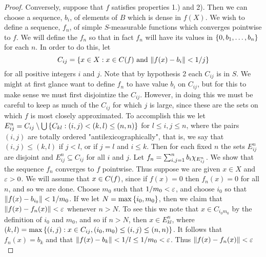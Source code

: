 \begin{proof}
Conversely, suppose that $f$ satisfies properties 1.) and 2). Then we can choose a sequence, $b_i$, of elements of $B$ which is dense in $f(X)$. We wish to define a sequence, $f_n$, of simple $S$-measurable functions which converges pointwise to $f$. We will define the $f_n$ so that in fact $f_n$ will have its values in $\left\{0, b_1, \dots, b_n\right\}$ for each $n$. In order to do this, let $$C_{ij}=\left\{x \in X: x\in C(f)\text{ and }\norm{f(x)-b_i}<1/j\right\}$$ for all positive integers $i$ and $j$. Note that by hypothesis 2 each $C_{i j}$ is in $S$. We might at first glance want to define $f_n$ to have value $b_i$ on $C_{i j}$, but for this to make sense we must first disjointize the $C_{i j}$. However, in doing this we must be careful to keep as much of the $C_{i j}$ for which $j$ is large, since these are the sets on which $f$ is most closely approximated. To accomplish this we let $E_{i j}^n=C_{i j}\setminus\bigcup\left\{C_{k l}:(i,j)<(k,l)\leq(n, n)\right\}$ for $l \leq i, j \leq n$, where the pairs $(i, j)$ are totally ordered "antilexicographically", that is, we say that $(i, j) \leq(k, l)$ if $j<l$, or if $j=l$ and $i \leq k$. Then for each fixed $n$ the sets $E_{i j}^n$ are disjoint and $E_{i j}^n \subseteq C_{i j}$ for all $i$ and $j$. Let $f_n=\sum_{i, j=1}^n b_i \chi_{E_{i j}^n}$. We show that the sequence $f_n$ converges to $f$ pointwise. Thus suppose we are given $x \in X$ and $\varepsilon>0$. We will assume that $x \in C(f)$, since if $f(x)=0$ then $f_n(x)=0$ for all $n$, and so we are done. Choose $m_0$ such that $1/m_0<\varepsilon$, and choose $i_0$ so that $\norm{f(x)-b_{i_0}}<1/m_0$. If we let $N=\max\left\{i_0, m_0\right\}$, then we claim that $\norm{f(x)-f_n(x)}<\varepsilon$ whenever $n>N$. To see this we note that $x\in C_{i_0m_0}$ by the definition of $i_0$ and $m_0$, and so if $n>N$, then $x \in E^n_{kl}$, where $(k, l)=\max\left\{(i, j): x \in C_{i j},(i_0, m_0) \leq(i, j) \leq(n, n)\right\}$. It follows that $f_n(x)=b_k$ and that $\norm{f(x)-b_k}<1/l \leq 1/m_0<\varepsilon$. Thus $\norm{f(x)-f_n(x)}<\varepsilon$
\end{proof}

